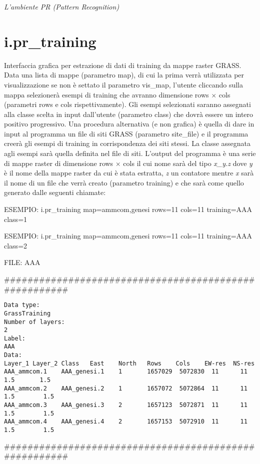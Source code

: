 

\begin{center}
  {\Large\em L'ambiente PR (Pattern Recognition)}
\end{center}
\vspace{1truecm}
\noindent

\section{i.pr\_training}
Interfaccia grafica per estrazione di dati di training da mappe raster
GRASS.  Data una lista di mappe (parametro map), di cui la prima
verr\`{a} utilizzata per visualizzazione se non \`{e} settato il
parametro vis\_map, l'utente cliccando sulla mappa selezioner\`{a}
esempi di training che avranno dimensione rows $\times$ cols
(parametri rows e cols rispettivamente).  Gli esempi selezionati
saranno assegnati alla classe scelta in input dall'utente (parametro
class) che dovr\`{a} essere un intero positivo progressivo.  Una
procedura alternativa (e non grafica) \`{e} quella di dare in input al
programma un file di siti GRASS (parametro site\_file) e il programma
creer\`{a} gli esempi di training in corrispondenza dei siti stessi.
La classe assegnata agli esempi sar\`{a} quella definita nel file di
siti. L'output del programma \`{e} una serie di mappe raster di
dimensione rows $\times$ cols il cui nome sar\`{a} del tipo {\em x\_y.z}
dove {\em y} \`{e} il nome della mappe raster da cui \`{e} stata estratta,
{\em z} un contatore mentre {\em x} sar\`{a} il nome di un file che
verr\`{a} creato (parametro training) e che sar\`{a} come quello generato
dalle seguenti chiamate:

ESEMPIO: i.pr\_training map=ammcom,genesi rows=11 cols=11 training=AAA class=1

ESEMPIO: i.pr\_training map=ammcom,genesi rows=11 cols=11 training=AAA class=2

FILE: AAA

\noindent
\#\#\#\#\#\#\#\#\#\#\#\#\#\#\#\#\#\#\#\#\#\#\#\#\#\#\#\#\#\#\#\#\#\#\#\#\#\#\#\#\#\#\#\#\#\#\#\#\#\#\#\#\#\#
\begin{verbatim}
Data type:
GrassTraining
Number of layers:
2
Label:
AAA
Data:
Layer_1 Layer_2 Class   East    North   Rows    Cols    EW-res  NS-res
AAA_ammcom.1    AAA_genesi.1    1       1657029  5072830  11      11      1.5       1.5
AAA_ammcom.2    AAA_genesi.2    1       1657072  5072864  11      11      1.5        1.5
AAA_ammcom.3    AAA_genesi.3    2       1657123  5072871  11      11      1.5        1.5
AAA_ammcom.4    AAA_genesi.4    2       1657153  5072910  11      11      1.5        1.5
\end{verbatim}
\noindent
\#\#\#\#\#\#\#\#\#\#\#\#\#\#\#\#\#\#\#\#\#\#\#\#\#\#\#\#\#\#\#\#\#\#\#\#\#\#\#\#\#\#\#\#\#\#\#\#\#\#\#\#\#\#

